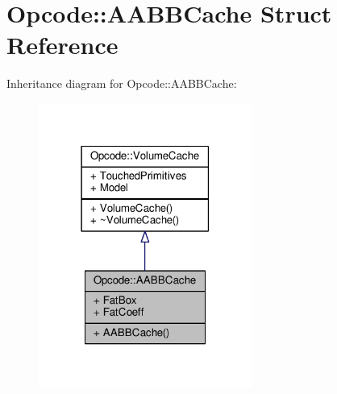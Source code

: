 \hypertarget{structOpcode_1_1AABBCache}{}\section{Opcode\+:\+:A\+A\+B\+B\+Cache Struct Reference}
\label{structOpcode_1_1AABBCache}


Inheritance diagram for Opcode\+:\+:A\+A\+B\+B\+Cache\+:
\nopagebreak
\begin{figure}[H]
\begin{center}
\leavevmode
\includegraphics[width=198pt]{d7/d8b/structOpcode_1_1AABBCache__inherit__graph}
\end{center}
\end{figure}


